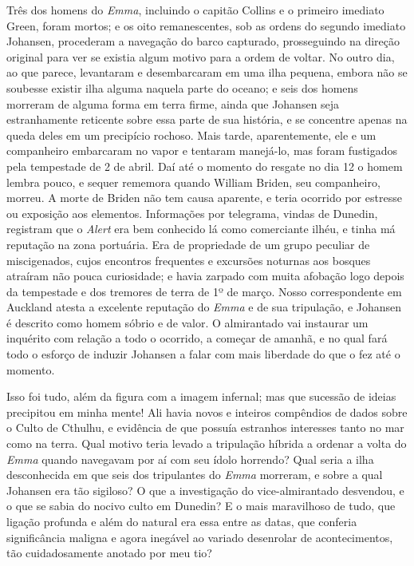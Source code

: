 Três dos homens do \emph{Emma}, incluindo o capitão Collins e o primeiro
imediato Green, foram mortos; e os oito remanescentes, sob as ordens do
segundo imediato Johansen, procederam a navegação do barco capturado,
prosseguindo na direção original para ver se existia algum motivo para a
ordem de voltar. No outro dia, ao que parece, levantaram e desembarcaram
em uma ilha pequena, embora não se soubesse existir ilha alguma naquela
parte do oceano; e seis dos homens morreram de alguma forma em terra
firme, ainda que Johansen seja estranhamente reticente sobre essa parte
de sua história, e se concentre apenas na queda deles em um precipício
rochoso. Mais tarde, aparentemente, ele e um companheiro embarcaram no
vapor e tentaram manejá-lo, mas foram fustigados pela tempestade de 2 de
abril. Daí até o momento do resgate no dia 12 o homem lembra pouco, e
sequer rememora quando William Briden, seu companheiro, morreu. A morte
de Briden não tem causa aparente, e teria ocorrido por estresse ou
exposição aos elementos. Informações por telegrama, vindas de Dunedin,
registram que o \emph{Alert} era bem conhecido lá como comerciante
ilhéu, e tinha má reputação na zona portuária. Era de propriedade de um
grupo peculiar de miscigenados, cujos encontros frequentes e excursões
noturnas aos bosques atraíram não pouca curiosidade; e havia zarpado com
muita afobação logo depois da tempestade e dos tremores de terra de
1º de março. Nosso correspondente em Auckland
atesta a excelente reputação do \emph{Emma} e de sua tripulação, e
Johansen é descrito como homem sóbrio e de valor. O almirantado vai
instaurar um inquérito com relação a todo o ocorrido, a começar de
amanhã, e no qual fará todo o esforço de induzir Johansen a falar com
mais liberdade do que o fez até o momento.

Isso foi tudo, além da figura com a imagem infernal; mas que sucessão de
ideias precipitou em minha mente! Ali havia novos e inteiros compêndios
de dados sobre o Culto de Cthulhu, e evidência de que possuía estranhos
interesses tanto no mar como na terra. Qual motivo teria levado a
tripulação híbrida a ordenar a volta do \emph{Emma} quando navegavam por
aí com seu ídolo horrendo? Qual seria a ilha desconhecida em que seis
dos tripulantes do \emph{Emma} morreram, e sobre a qual Johansen era tão
sigiloso? O que a investigação do vice-almirantado desvendou, e o que se
sabia do nocivo culto em Dunedin? E o mais maravilhoso de tudo, que
ligação profunda e além do natural era essa entre as datas, que conferia
significância maligna e agora inegável ao variado desenrolar de
acontecimentos, tão cuidadosamente anotado por meu tio?

